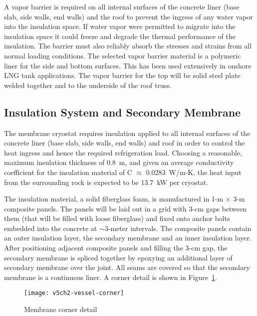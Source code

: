 A vapor barrier is required on all internal surfaces of the concrete liner (base slab, side walls, end walls) 
and the roof to prevent the ingress of any water vapor into the insulation space. If water vapor were permitted to migrate into the insulation space it could freeze and degrade the thermal performance of the insulation. The barrier must also reliably absorb the stresses and strains from all normal loading conditions. The selected vapor barrier material is a polymeric liner for the side and bottom surfaces.  This has been used extensively in onshore LNG tank applications.  The vapor barrier for the top will be solid steel plate welded together and to the underside of the roof truss.


\subsection{Insulation System and Secondary Membrane}
\label{subsec:insul-2nd-mem}

The membrane cryostat requires insulation applied to all internal surfaces of the concrete liner (base slab, 
side walls, end walls) and roof in order to control the heat ingress and hence the required refrigeration load. 
Choosing a reasonable, maximum insulation thickness of 0.8~m, and given an average conductivity 
coefficient for the insulation material of C $\approx$ 0.0283~W/m-K, the heat input from the surrounding rock 
is expected to be 13.7~kW per cryostat. %



The insulation material, a solid fiberglass foam, is manufactured in 1-m $\times$ 3-m composite panels. The panels will be laid out in a grid with 3-cm gaps between them (that will be filled with loose fiberglass) and fixed onto anchor bolts embedded into the concrete at $\sim$3-meter intervals. 
The composite panels contain an outer insulation layer, the secondary membrane and an inner insulation layer. After positioning adjacent composite panels and filling the 3-cm gap, the secondary membrane is spliced together by epoxying an additional layer of secondary membrane over the joint.  All seams are covered so that the secondary membrane is a continuous liner. A corner detail is shown in Figure~\ref{fig:vessel-corner}.


\begin{figure}[htbp]
\centering
\texttt{[image: v5ch2-vessel-corner]}
\caption{Membrane corner detail}
\label{fig:vessel-corner} %
\end{figure}

